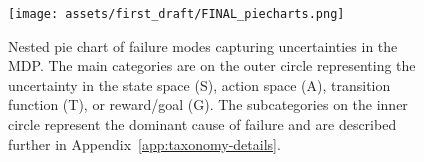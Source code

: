 \begin{figure}[t!]
    \centering
    \texttt{[image: assets/first\_draft/FINAL\_piecharts.png]}
    \caption{Nested pie chart of \gptfo{} \react{} failure modes capturing uncertainties in the MDP. The main categories are on the outer circle representing the uncertainty in the state space (S), action space (A), transition function (T), or reward/goal (G). The subcategories on the inner circle represent the dominant cause of failure and are described further in Appendix~\ref{app:taxonomy-details}.}
    \label{fig:piechart_taxonomy}
\end{figure}